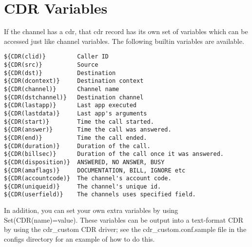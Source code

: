 \section{CDR Variables}

If the channel has a cdr, that cdr record has its own set of variables which 
can be accessed just like channel variables. The following builtin variables
are available.

\begin{verbatim}
${CDR(clid)}         Caller ID
${CDR(src)}          Source 
${CDR(dst)}          Destination
${CDR(dcontext)}     Destination context
${CDR(channel)}      Channel name
${CDR(dstchannel)}   Destination channel
${CDR(lastapp)}      Last app executed
${CDR(lastdata)}     Last app's arguments
${CDR(start)}        Time the call started.
${CDR(answer)}       Time the call was answered.
${CDR(end)}          Time the call ended.
${CDR(duration)}     Duration of the call.
${CDR(billsec)}      Duration of the call once it was answered.
${CDR(disposition)}  ANSWERED, NO ANSWER, BUSY
${CDR(amaflags)}     DOCUMENTATION, BILL, IGNORE etc
${CDR(accountcode)}  The channel's account code.
${CDR(uniqueid)}     The channel's unique id.
${CDR(userfield)}    The channels uses specified field.
\end{verbatim}

In addition, you can set your own extra variables by using Set(CDR(name)=value).
These variables can be output into a text-format CDR by using the cdr\_custom
CDR driver; see the cdr\_custom.conf.sample file in the configs directory for
an example of how to do this.
